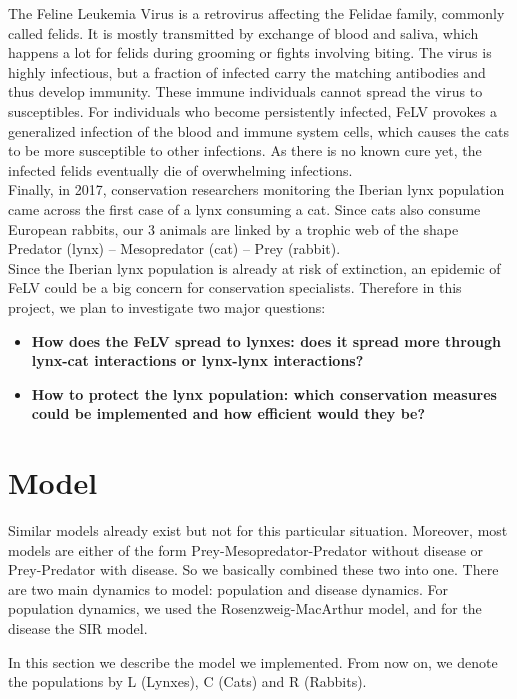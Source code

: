 \documentclass[12pt]{article}
\begin{document}
\quad The Feline Leukemia Virus is a retrovirus affecting the Felidae family, commonly called felids. It is mostly transmitted by exchange of blood and saliva, which happens a lot for felids during grooming or fights involving biting. The virus is highly infectious, but a fraction of infected carry the matching antibodies and thus develop immunity. These immune individuals cannot spread the virus to susceptibles. For individuals who become persistently infected, FeLV provokes a generalized infection of the blood and immune system cells, which causes the cats to be more susceptible to other infections. As there is no known cure yet, the infected felids eventually die of overwhelming infections.\\
 
\quad Finally, in 2017, conservation researchers monitoring the Iberian lynx population came across the first case of a lynx consuming a cat\cite{najera_lynx_2019}. Since cats also consume European rabbits, our 3 animals are linked by a trophic web of the shape Predator (lynx) – Mesopredator (cat) – Prey (rabbit).\\

\quad Since the Iberian lynx population is already at risk of extinction, an epidemic of FeLV could be a big concern for conservation specialists. Therefore in this project, we plan to investigate two major questions:
\begin{itemize}
    \item \textbf{How does the FeLV spread to lynxes: does it spread more through lynx-cat interactions or lynx-lynx interactions?}
    \item \textbf{How to protect the lynx population: which conservation measures could be implemented and how efficient would they be?}
\end{itemize}

\section{Model}
\quad Similar models already exist but not for this particular situation. Moreover, most models are either of the form Prey-Mesopredator-Predator without disease or Prey-Predator with disease. So we basically combined these two into one. There are two main dynamics to model: population and disease dynamics. For population dynamics, we used the Rosenzweig-MacArthur model, and for the disease the SIR model.

\quad In this section we describe the model we implemented. From now on, we denote the populations by L (Lynxes), C (Cats) and R (Rabbits).
\end{document}
